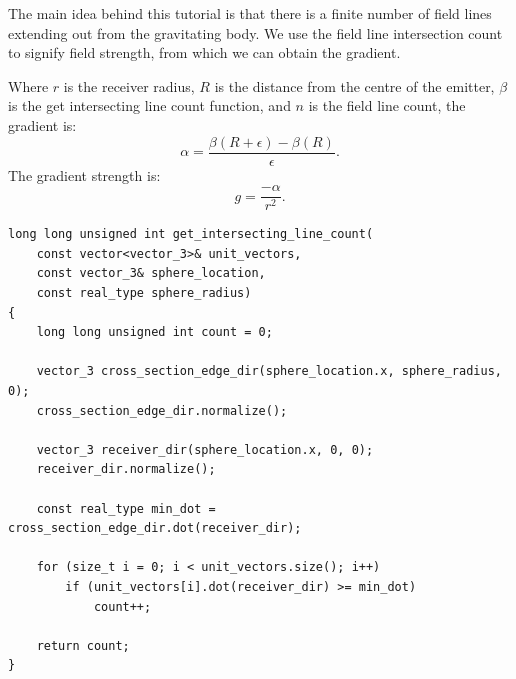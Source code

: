 \documentclass[12pt]{article}
\begin{document}
The main idea behind this tutorial is that there is a finite number of field lines extending out from the gravitating body. 
We use the field line intersection count to signify field strength, from which we can obtain the gradient.

Where $r$ is the receiver radius, $R$ is the distance from the centre of the emitter, $\beta$ is the get intersecting line count function, and $n$ is the field line count, the gradient is:
\begin{equation}
\alpha = \frac{\beta(R + \epsilon) - \beta(R)}{\epsilon}.
\end{equation}
The gradient strength is:
\begin{equation}
g = \frac{-\alpha}{r^2}.
\end{equation}

\begin{lstlisting}
long long unsigned int get_intersecting_line_count(
	const vector<vector_3>& unit_vectors,
	const vector_3& sphere_location,
	const real_type sphere_radius)
{
	long long unsigned int count = 0;

	vector_3 cross_section_edge_dir(sphere_location.x, sphere_radius, 0);
	cross_section_edge_dir.normalize();

	vector_3 receiver_dir(sphere_location.x, 0, 0);
	receiver_dir.normalize();

	const real_type min_dot = cross_section_edge_dir.dot(receiver_dir);

	for (size_t i = 0; i < unit_vectors.size(); i++)
		if (unit_vectors[i].dot(receiver_dir) >= min_dot)
			count++;

	return count;
}
\end{lstlisting}
\end{document}
